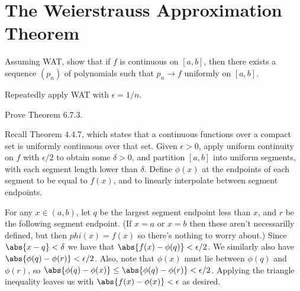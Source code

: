\section{The Weierstrauss Approximation Theorem}

\begin{exercise}
Assuming WAT, show that if \(f\) is continuous on \([a, b]\), then there exists a sequence \((p_n)\) of polynomials such that \(p_n \to f\) uniformly on \([a, b]\).
\end{exercise}
\begin{solution}
Repeatedly apply WAT with \(\epsilon = 1/n\).
\end{solution}

\begin{exercise}
Prove Theorem 6.7.3.
\end{exercise}
\begin{solution}
Recall Theorem 4.4.7, which states that a continuous functions over a compact set is uniformly continuous over that set. Given \(\epsilon > 0\), apply uniform continuity on \(f\) with \(\epsilon/2\) to obtain some \(\delta > 0\), and partition \([a,b]\) into uniform segments, with each segment length lower than \(\delta\). Define \(\phi(x)\) at the endpoints of each segment to be equal to \(f(x)\), and to linearly interpolate between segment endpoints.

For any \(x \in (a, b)\), let \(q\) be the largest segment endpoint less than \(x\), and \(r\) be the following segment endpoint. (If \(x = a\) or \(x = b\) then these aren't necessarilly defined, but then \(phi(x) = f(x)\) so there's nothing to worry about.) Since \(\abs{x-q} < \delta\) we have that \(\abs{f(x) - \phi(q)} < \epsilon/2\). We similarly also have \(\abs{\phi(q) - \phi(r)} < \epsilon/2\). Also, note that \(\phi(x)\) must lie between \(\phi(q)\) and \(\phi(r)\), so \(\abs{\phi(q) - \phi(x)} \leq \abs{\phi(q) - \phi(r)} < \epsilon/2\). Applying the triangle inequality leaves us with \(\abs{f(x) - \phi(x)}< \epsilon\) as desired.
\end{solution}
